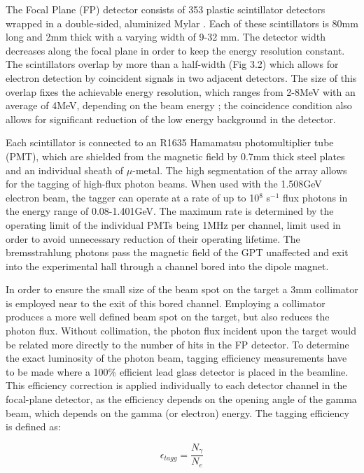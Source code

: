 \indent The Focal Plane (FP) detector consists of 353 plastic scintillator detectors wrapped in a double-sided, aluminized Mylar \cite{sjhall}. Each of these scintillators is 80mm long and 2mm thick with a varying width of 9-32 mm. The detector width decreases along the focal plane in order to keep the energy resolution constant. The scintillators overlap by more than a half-width (Fig 3.2) which allows for electron detection by coincident signals in two adjacent detectors. The size of this overlap fixes the achievable energy resolution, which ranges from 2-8MeV with an average of 4MeV, depending on the beam energy \cite{mcgeorge}; the coincidence condition also allows for significant reduction of the low energy background in the detector.

\indent Each scintillator is connected to an R1635 Hamamatsu photomultiplier tube (PMT), which are shielded from the magnetic field by 0.7mm thick steel plates and an individual sheath of $\mu$-metal. The high segmentation of the array allows for the tagging of high-flux photon beams. When used with the 1.508GeV electron beam, the tagger can operate at a rate of up to 10$^{8}$ s$^{-1}$ flux photons in the energy range of 0.08-1.401GeV. The maximum rate is determined by the operating limit of the individual PMTs being 1MHz per channel, limit used in order to avoid unnecessary reduction of their operating lifetime. The bremsstrahlung photons pass the magnetic field of the GPT unaffected and exit into the experimental hall through a channel bored into the dipole magnet.

\indent In order to ensure the small size of the beam spot on the target a 3mm collimator is employed near to the exit of this bored channel. Employing a collimator produces a more well defined beam spot on the target, but also reduces the photon flux.  Without collimation, the photon flux incident upon the target would be related more directly to the number of hits in the FP detector. To determine the exact luminosity of the photon beam, tagging efficiency measurements have to be made where a 100\% efficient lead glass detector is placed in the beamline.  This efficiency correction is applied individually to each detector channel in the focal-plane detector, as the efficiency depends on the opening angle of the gamma beam, which depends on the gamma (or electron) energy. The tagging efficiency is defined as:

\begin{equation}
\epsilon_{tagg}=\frac{N_{\gamma}}{N_{e}}
\end{equation}


